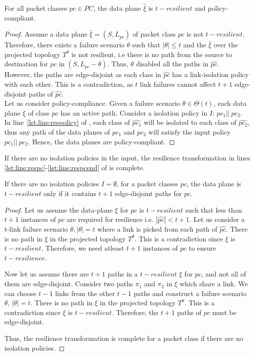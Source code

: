 \begin{theorem}[Soundness]
	For all packet classes $pc \in PC$, the data plane $\hat{\xi}$ is $t-resilient$ 
	and policy-compliant. 
\end{theorem}
\begin{proof}
	Assume a data plane $\hat{\xi} = (S, L_{pc})$ of packet class $pc$ is not $t-resilient$. 
	Therefore, there exists a failure scenario $\theta$ such that $|\theta| \leq t$ 
	and  the $\hat{\xi}$ over the projected topology $T^\theta$ 
	is not resilient, i.e there is no path from the source to destination for
	$pc$ in $(S,L_{pc} - \theta)$.
	Thus, $\theta$ disabled all the paths in $\hat{pc}$. \\
	However, the paths are
	edge-disjoint as each class in $\hat{pc}$ has a link-isolation policy with each 
	other. This is a contradiction, as $t$ link failures cannot affect $t+1$ 
	edge-disjoint paths of $\hat{pc}$. \\
	Let us consider policy-compliance. Given a failure scenario $\theta \in \Theta(t)$, each data plane $\xi$ of class $pc$ has an active path. Consider a isolation policy in $I$: $pc_1 || \ pc_2$. In line~\ref{lst:line:respolicy} of , each class of $\hat{pc_1}$ will be isolated to
	each class of $\hat{pc_2}$, thus any path of the data planes of $pc_1$ and
	$pc_2$ will satisfy the input policy $pc_1 || \ pc_2$. Hence, the data planes 
	are policy-compliant. 
\end{proof}
\noindent If there are no isolation policies in the input, the resilience transformation in lines 
\ref{lst:line:respc}-\ref{lst:line:respcend} of  is complete.
\begin{theorem}[Completeness]
If there are no isolation policies $I = \emptyset$, 
	for a packet classes $pc$, the data plane is $t-resilient$ only if it 
	contains $t + 1$ edge-disjoint paths for $pc$.
\end{theorem}
\begin{proof}
	Let us assume the data-plane $\xi$ for $pc$ is $t-resilient$ such 
	that less than $t+1$ instances of $pc$ are required for resilience i.e. 
	$|\hat{pc}| < t+1$. Let us consider a 
	t-link failure scenario $\theta, |\theta| = t$ where a link is picked from
	each path of $\hat{pc}$. There is no path in $\xi$ in the projected
	topology $T^\theta$. This is a contradiction since $\xi$ is $t-resilient$. 
	Therefore, we need atleast $t+1$ instances of $pc$ to ensure $t-resilience$.
	
	Now let us assume there are $t+1$ paths in a $t-resilient$ $\xi$ for $pc$,
	and not all of them are edge-disjoint. Consider two paths $\pi_1$ and $\pi_2$
	in $\xi$ which share a link. We can choose $t-1$ links from the other $t-1$ paths 
	and construct a failure scenario $\theta$, $|\theta| = t$. 
	There is no path in $\xi$ in the projected
	topology $T^\theta$. This is a contradiction since $\xi$ is $t-resilient$. Therefore,
	the $t+1$ paths of $pc$ must be edge-disjoint. 
	
	\noindent Thus, the resilience transformation is complete for a  
	packet class if there are no isolation policies.
\end{proof}
